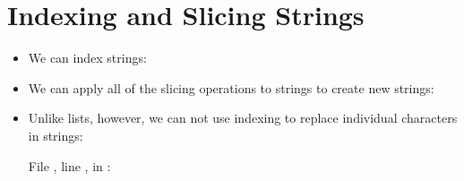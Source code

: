 \documentclass[letterpaper,10pt,english]{sphinxmanual}
\begin{document}
\section{Indexing and Slicing Strings}
\label{\detokenize{lecture_notes/lec10_lists2:indexing-and-slicing-strings}}\begin{itemize}
\item {} 
We can index strings:

\begin{sphinxVerbatim}[commandchars=\\\{\}]
  
\PYG{p}{[}\PYG{p}{]}
\PYG{p}{[}\PYG{p}{]}
\end{sphinxVerbatim}

\item {} 
We can apply all of the slicing operations to strings to create new
strings:

\begin{sphinxVerbatim}[commandchars=\\\{\}]
  
\PYG{p}{[}\PYG{p}{]}
\end{sphinxVerbatim}

\item {} 
Unlike lists, however, we can not use indexing to replace individual
characters in strings:

\begin{sphinxVerbatim}[commandchars=\\\{\}]
\PYG{p}{[}\PYG{p}{]}  
  File , line , in 
: 
\end{sphinxVerbatim}

\end{itemize}
\end{document}
